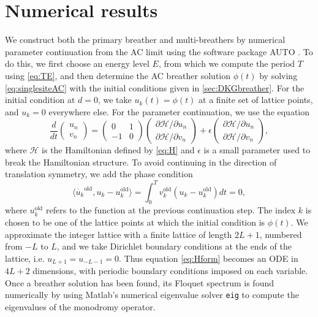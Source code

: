 \documentclass[12pt,reqno]{amsart}
\def\calH{\mathcal{H}}
\theoremstyle{definition}
\begin{document}
\section{Numerical results}\label{sec:numerics}

We construct both the primary breather and multi-breathers by numerical parameter continuation from the AC limit using the software package AUTO \cite{auto07p}. To do this, we first choose an energy level $E$, from which we compute the period $T$ using \cref{eq:TE}, and then determine the AC breather solution $\phi(t)$ by solving \cref{eq:singlesiteAC} with the initial conditions given in \cref{sec:DKGbreather}. For the initial condition at $d = 0$, we take $u_k(t) = \phi(t)$ at a finite set of lattice points, and $u_k = 0$ everywhere else. For the parameter continuation, we use the equation
\begin{equation}\label{eq:HformAUTO}
\frac{d}{dt}\begin{pmatrix} u_n \\ v_n \end{pmatrix} = 
\begin{pmatrix} 0 & 1 \\ -1 & 0 \end{pmatrix}\begin{pmatrix} \partial \calH / \partial u_n \\ \partial \calH / \partial v_n \end{pmatrix} + 
\epsilon \begin{pmatrix} \partial \calH / \partial u_n \\ \partial \calH / \partial v_n \end{pmatrix},
\end{equation}
where $\calH$ is the Hamiltonian defined by \cref{eq:H} and $\epsilon$ is a small parameter used to break the Hamiltonian structure. To avoid continuing in the direction of translation symmetry, we add the phase condition
\[
\langle \dot{u_k}^\text{old}, u_k - u_k^\text{old} \rangle =
\int_0^T v_k^\text{old}( u_k - u_k^\text{old}) dt = 0,
\]
where $u_k^\text{old}$ refers to the function at the previous continuation step. The index $k$ is chosen to be one of the lattice points at which the initial condition is $\phi(t)$. We approximate the integer lattice with a finite lattice of length $2L+1$, numbered from $-L$ to $L$, and we take Dirichlet boundary conditions at the ends of the lattice, i.e. $u_{L+1} = u_{-L-1} = 0$. Thus equation \cref{eq:Hform} becomes an ODE in $4L+2$ dimensions, with periodic boundary conditions imposed on each variable. Once a breather solution has been found, its Floquet spectrum is found numerically by using Matlab's numerical eigenvalue solver \texttt{eig} to compute the eigenvalues of the monodromy operator.
\end{document}
